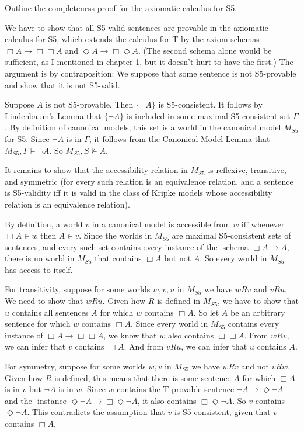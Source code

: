 \begin{exercise}
  Outline the completeness proof for the axiomatic calculus for S5.
\end{exercise}
\begin{solution}
  We have to show that all S5-valid sentences are provable in the axiomatic
  calculus for S5, which extends the calculus for T by the axiom schemas
  $\Box A \to \Box\Box A$ and $\Diamond A \to \Box\Diamond A$. (The second
  schema alone would be sufficient, as I mentioned in chapter 1, but it doesn't
  hurt to have the first.) The argument is by contraposition: We suppose that
  some sentence is not S5-provable and show that it is not S5-valid.

  Suppose $A$ is not S5-provable. Then $\{ \neg A \}$ is S5-consistent. It
  follows by Lindenbaum's Lemma that $\{ \neg A \}$ is included in some maximal
  S5-consistent set $\Gamma$. By definition of canonical models, this set is a
  world in the canonical model $M_{S5}$ for S5. Since $\neg A$ is in $\Gamma$,
  it follows from the Canonical Model Lemma that $M_{S5},\Gamma \models \neg A$.
  So $M_{S5},S \not\models A$.

  It remains to show that the accessibility relation in $M_{S5}$ is reflexive,
  transitive, and symmetric (for every such relation is an equivalence relation,
  and a sentence is S5-validity iff it is valid in the class of Kripke models
  whose accessibility relation is an equivalence relation).

  By definition, a world $v$ in a canonical model is accessible from $w$ iff
  whenever $\Box A \in w$ then $A \in v$. Since the worlds in $M_{S5}$ are
  maximal S5-consistent sets of sentences, and every such set contains every
  instance of the -schema $\Box A \to A$, there is no world in $M_{S5}$
  that contains $\Box A$ but not $A$. So every world in $M_{S5}$ has access to
  itself.

  For transitivity, suppose for some worlds $w,v,u$ in $M_{S5}$ we have $wRv$
  and $vRu$. We need to show that $wRu$. Given how $R$ is defined in $M_{S5}$,
  we have to show that $u$ contains all sentences $A$ for which $w$ contains
  $\Box A$. So let $A$ be an arbitrary sentence for which $w$ contains $\Box
  A$. Since every world in $M_{S5}$ contains every instance of
  $\Box A \to \Box\Box A$, we know that $w$ also contains $\Box\Box A$. From
  $wRv$, we can infer that $v$ contains $\Box A$. And from $vRu$, we can infer
  that $u$ contains $A$. 

  For symmetry, suppose for some worlds $w,v$ in $M_{S5}$ we have $wRv$ and not
  $vRw$. Given how $R$ is defined, this means that there is some sentence $A$
  for which $\Box A$ is in $v$ but $\neg A$ is in $w$. Since $w$ contains the
  T-provable sentence $\neg A \to \Diamond \neg A$ and the -instance
  $\Diamond \neg A \to \Box \Diamond \neg A$, it also contains
  $\Box \Diamond \neg A$. So $v$ contains $\Diamond \neg A$. This contradicts
  the assumption that $v$ is S5-consistent, given that $v$ contains $\Box A$. 
\end{solution}

